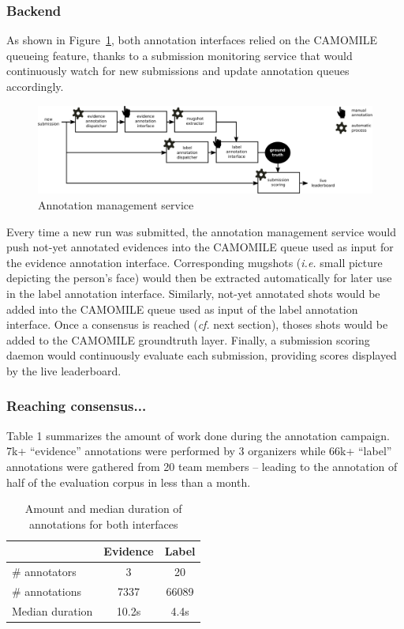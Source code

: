 \documentclass[10pt, a4paper]{article}
\begin{document}
\subsubsection{Backend}

As shown in Figure~\ref{fig:backend}, both annotation interfaces relied on the
CAMOMILE queueing feature, thanks to a submission monitoring service that would
continuously watch for new submissions and update annotation queues accordingly.

\begin{figure}[htb]
\centering
\includegraphics[width=0.85\linewidth]{figs/backend.pdf}
\caption{Annotation management service}
\label{fig:backend}
\end{figure}

Every time a new run was submitted, the annotation management service would
push not-yet annotated evidences into the CAMOMILE queue used as input for the
evidence annotation interface. Corresponding mugshots (\emph{i.e.} small picture
depicting the person's face) would then be extracted automatically for later
use in the label annotation interface. Similarly, not-yet annotated shots would
be added into the CAMOMILE queue used as input of the label annotation interface.
Once a consensus is reached (\emph{cf.} next section), thoses shots would be
added to the CAMOMILE groundtruth layer. Finally, a submission scoring daemon
would continuously evaluate each submission, providing scores displayed by the
live leaderboard.

\subsubsection{Reaching consensus...}

Table 1 summarizes the amount of work done during the annotation campaign.
7k+ ``evidence'' annotations were performed by 3 organizers while 66k+ ``label''
annotations were gathered from 20 team members -- leading to the annotation of
half of the evaluation corpus in less than a month.

\begin{table}[ht]
  \centering
  \begin{tabular}{|l|c|c|}
    \hline
                           & Evidence  & Label      \\
    \hline
    \hline
    \# annotators           & 3         & 20         \\
    \# annotations          & 7337      & 66089      \\
    Median duration        & 10.2s     & 4.4s       \\
    \hline
  \end{tabular}
  \caption{Amount and median duration of annotations for both interfaces}
  \label{tab:annotations}
\end{table}
\end{document}

